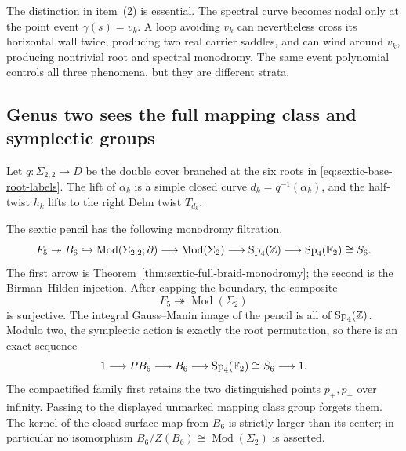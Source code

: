 The distinction in item~(2) is essential.  The spectral curve becomes nodal
only at the point event $\gamma(s)=v_k$.  A loop avoiding $v_k$ can nevertheless
cross its horizontal wall twice, producing two real carrier saddles, and can
wind around $v_k$, producing nontrivial root and spectral monodromy.  The same
event polynomial controls all three phenomena, but they are different strata.

\subsection{Genus two sees the full mapping class and symplectic groups}

Let $q:\Sigma_{2,2}\to D$ be the double cover branched at the six roots in
\eqref{eq:sextic-base-root-labels}.  The lift of $\alpha_k$ is a simple closed
curve $d_k=q^{-1}(\alpha_k)$, and the half-twist $h_k$ lifts to the right Dehn
twist $T_{d_k}$.

\begin{theorem}
\label{thm:sextic-full-genus-two-monodromy}
The sextic pencil has the following monodromy filtration.
\begin{equation}
 F_5\twoheadrightarrow B_6
 \hookrightarrow\operatorname{Mod}(\Sigma_{2,2};\partial)
 \longrightarrow\operatorname{Mod}(\Sigma_2)
 \longrightarrow\operatorname{Sp}_4(\mathbb{Z})
 \longrightarrow\operatorname{Sp}_4(\mathbb{F}_2)\cong S_6.
 \label{eq:sextic-monodromy-filtration}
\end{equation}
The first arrow is Theorem~\ref{thm:sextic-full-braid-monodromy}; the second is
the Birman--Hilden injection.  After capping the boundary, the composite
\begin{equation}
 F_5\twoheadrightarrow\operatorname{Mod}(\Sigma_2)
 \label{eq:sextic-full-mapping-class-surjection}
\end{equation}
is surjective.  The integral Gauss--Manin image of the pencil is all of
$\operatorname{Sp}_4(\mathbb{Z})$.  Modulo two, the symplectic action is exactly the
root permutation, so there is an exact sequence
\begin{equation}
 1\longrightarrow PB_6\longrightarrow B_6
 \longrightarrow\operatorname{Sp}_4(\mathbb{F}_2)\cong S_6
 \longrightarrow1.
 \label{eq:sextic-mod-two-forgetting-sequence}
\end{equation}
The compactified family first retains the two distinguished points
$p_+,p_-$ over infinity.  Passing to the displayed unmarked mapping class group
forgets them.  The kernel of the closed-surface map from $B_6$ is strictly
larger than its center; in particular no isomorphism
$B_6/Z(B_6)\cong\operatorname{Mod}(\Sigma_2)$ is asserted.
\end{theorem}

